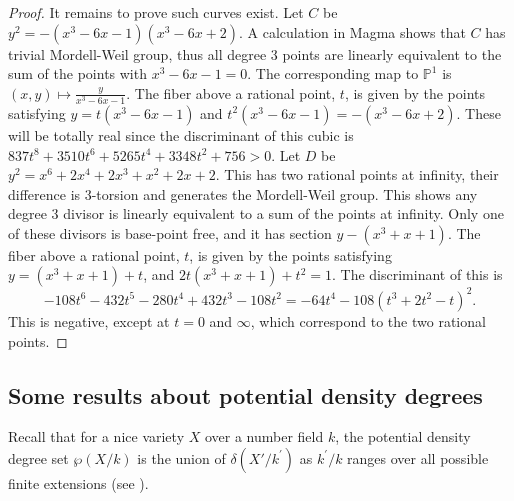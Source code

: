 \documentclass[a4paper,11pt]{amsart}
\theoremstyle{plain}
\theoremstyle{remark}
\begin{document}
\begin{proof}
    It remains to prove such curves exist. Let $C$ be $y^2 = -(x^3 - 6x -1)(x^3 - 6x + 2)$. A calculation in Magma shows that $C$ has trivial Mordell-Weil group, thus all degree 3 points are linearly equivalent to the sum of the points with $x^3 - 6x - 1 =0$. The corresponding map to $\mathbb{P}^1$ is $(x, y) \mapsto \frac{y}{x^3 - 6x - 1}$. The fiber above a rational point, $t$, is given by the points satisfying $y = t(x^3 - 6x - 1)$ and $t^2 (x^3 - 6x - 1) = -(x^3 - 6x + 2)$. These will be totally real since the discriminant of this cubic is $837t^8 + 3510t^6 + 5265t^4 + 3348t^2 + 756 > 0$.
    Let $D$ be $y^2 = x^6 + 2x^4 + 2x^3 + x^2 + 2x + 2$. This has two rational points at infinity, their difference is 3-torsion and generates the Mordell-Weil group. This shows any degree 3 divisor is linearly equivalent to a sum of the points at infinity. Only one of these divisors is base-point free, and it has section $y - (x^3 + x + 1)$. The fiber above a rational point, $t$, is given by the points satisfying $y = (x^3 + x + 1) + t$, and $2t(x^3 + x + 1) + t^2 = 1$. The discriminant of this is 
    $$-108t^6 - 432t^5 - 280t^4 + 432t^3 - 108t^2 = -64t^4 - 108(t^3 + 2t^2 - t)^2.$$
    This is negative, except at $t = 0$ and $\infty$, which correspond to the two rational points.
\end{proof}


\subsection{Some results about potential density degrees}
Recall that for a nice variety $X$ over a number field $k$, the potential density degree set $\wp(X / k)$ is the union of $\delta\left(X' / k^{\prime}\right)$ as $k^{\prime} / k$ ranges over all possible finite extensions (see ). 
\end{document}
